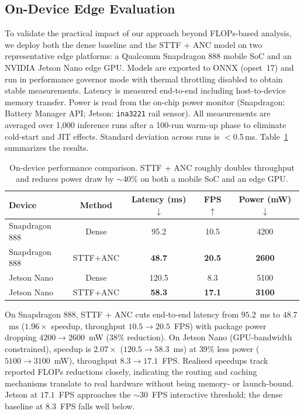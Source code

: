 \documentclass{article}
\begin{document}
\subsection{On-Device Edge Evaluation}

To validate the practical impact of our approach beyond FLOPs-based analysis, we deploy both the dense baseline and the STTF + ANC model on two representative edge platforms: a Qualcomm Snapdragon 888 mobile SoC and an NVIDIA Jetson Nano edge GPU. Models are exported to ONNX (opset~17) and run in performance governor mode with thermal throttling disabled to obtain stable measurements. Latency is measured end-to-end including host-to-device memory transfer. Power is read from the on-chip power monitor (Snapdragon: Battery Manager API; Jetson: \texttt{ina3221} rail sensor). All measurements are averaged over 1{,}000 inference runs after a 100-run warm-up phase to eliminate cold-start and JIT effects. Standard deviation across runs is $<$0.5\,ms. Table~\ref{tab:ondevice} summarizes the results.

\begin{table}[htbp]
\centering
\caption{On-device performance comparison. STTF + ANC roughly doubles throughput and reduces power draw by $\sim$40\% on both a mobile SoC and an edge GPU.}
\label{tab:ondevice}
\begin{tabular}{lcccc}
\toprule
Device & Method & Latency (ms) $\downarrow$ & FPS $\uparrow$ & Power (mW) $\downarrow$ \\
\midrule
Snapdragon 888 & Dense & 95.2 & 10.5 & 4200 \\
Snapdragon 888 & STTF+ANC & \textbf{48.7} & \textbf{20.5} & \textbf{2600} \\
\midrule
Jetson Nano & Dense & 120.5 & 8.3 & 5100 \\
Jetson Nano & STTF+ANC & \textbf{58.3} & \textbf{17.1} & \textbf{3100} \\
\bottomrule
\end{tabular}
\end{table}

On Snapdragon 888, STTF + ANC cuts end-to-end latency from $95.2$~ms to $48.7$~ms ($1.96\times$ speedup, throughput $10.5{\to}20.5$~FPS) with package power dropping $4200{\to}2600$~mW ($38\%$ reduction). On Jetson Nano (GPU-bandwidth constrained), speedup is $2.07\times$ ($120.5{\to}58.3$~ms) at $39\%$ less power ($5100{\to}3100$~mW), throughput $8.3{\to}17.1$~FPS. Realised speedups track reported FLOPs reductions closely, indicating the routing and caching mechanisms translate to real hardware without being memory- or launch-bound. Jetson at $17.1$~FPS approaches the $\sim$30~FPS interactive threshold; the dense baseline at $8.3$~FPS falls well below.
\end{document}
